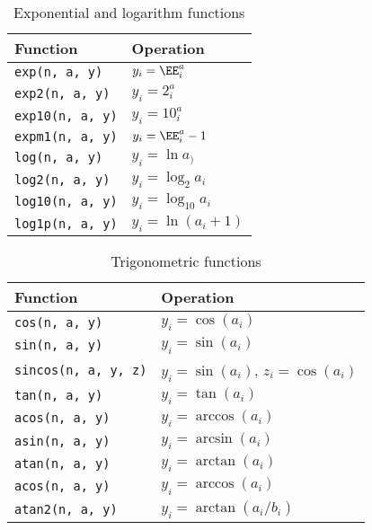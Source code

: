 \begin{table}
  \begin{tabularx}{\textwidth}{LL}
    \toprule
    Function & Operation \\
    \midrule
    \verb|exp(n, a, y)|   & $y_i = \EE^a_i$       \\
    \verb|exp2(n, a, y)|  & $y_i = 2^a_i$         \\
    \verb|exp10(n, a, y)| & $y_i = 10^a_i$        \\
    \verb|expm1(n, a, y)| & $y_i = \EE^a_i - 1$   \\
    \verb|log(n, a, y)|   & $y_i = \ln a_)$       \\
    \verb|log2(n, a, y)|  & $y_i = \log_2 a_i$    \\
    \verb|log10(n, a, y)| & $y_i = \log_{10} a_i$ \\
    \verb|log1p(n, a, y)| & $y_i = \ln(a_i + 1)$  \\
    \bottomrule
  \end{tabularx}
  \caption{Exponential and logarithm functions}
  \label{tab:Exponential and logarithm functions}
\end{table}

\begin{table}
  \begin{tabularx}{\textwidth}{LL}
    \toprule
    Function & Operation \\
    \midrule
    \verb|cos(n, a, y)|       & $y_i = \cos(a_i)$                    \\
    \verb|sin(n, a, y)|       & $y_i = \sin(a_i)$                    \\
    \verb|sincos(n, a, y, z)| & $y_i = \sin(a_i)$, $z_i = \cos(a_i)$ \\
    \verb|tan(n, a, y)|       & $y_i = \tan(a_i)$                    \\
    \verb|acos(n, a, y)|      & $y_i = \arccos(a_i)$                 \\
    \verb|asin(n, a, y)|      & $y_i = \arcsin(a_i)$                 \\
    \verb|atan(n, a, y)|      & $y_i = \arctan(a_i)$                 \\
    \verb|acos(n, a, y)|      & $y_i = \arccos(a_i)$                 \\
    \verb|atan2(n, a, y)|     & $y_i = \arctan(a_i / b_i)$           \\
    \bottomrule
  \end{tabularx}
  \caption{Trigonometric functions}
  \label{tab:Trigonometric functions}
\end{table}

